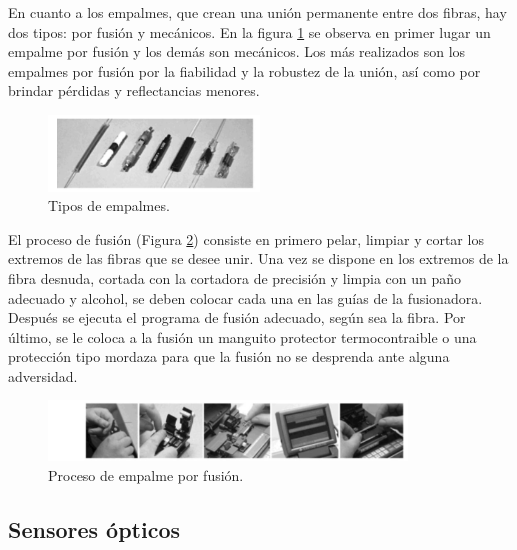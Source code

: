 \begin{itemize}
 		En cuanto a los empalmes, que crean una unión permanente entre dos fibras, hay dos tipos: por fusión y mecánicos. En la figura \ref{fig:empalmeTipo} se observa en primer lugar un empalme por fusión y los demás son mecánicos. Los más realizados son los empalmes por fusión por la fiabilidad y la robustez de la unión, así como por brindar pérdidas y reflectancias menores.
 		
 		\begin{figure}[H]
 			\centering
 			\includegraphics[width=0.5\textwidth]{./img/tiposEmpalme}
 			\caption{Tipos de empalmes. \cite{FOAconect}} 
 			\label{fig:empalmeTipo}
 		\end{figure} 
 	
 		 
 		
 		El proceso de fusión (Figura \ref{fig:procFusion}) consiste en primero pelar, limpiar y cortar los extremos de las fibras que se desee unir. Una vez se dispone en los extremos de la fibra desnuda, cortada con la cortadora de precisión y limpia con un paño adecuado y alcohol, se deben colocar cada una en las guías de la fusionadora. Después se ejecuta el programa de fusión adecuado, según sea la fibra. Por último, se le coloca a la fusión un manguito protector termocontraible o una protección tipo mordaza para que la fusión no se desprenda ante alguna adversidad.
 		
 		\begin{figure}[H]
 			\centering
 			\includegraphics[width=0.85\textwidth]{./img/procesoFusion}
 			\caption{Proceso de empalme por fusión. \cite{FOAconect}} 
 			\label{fig:procFusion}
 		\end{figure}

 	 \end{itemize}					

\subsection{Sensores ópticos} %
\label{sec:sensores3}

